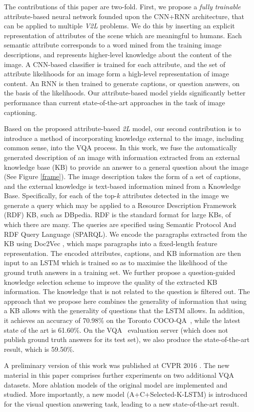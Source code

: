 The contributions of this paper are two-fold.
First, we propose a {\em fully trainable} attribute-based neural network founded upon the CNN+RNN architecture,
that can be applied to multiple \textit{V2L} problems.
We do this by inserting an explicit representation of attributes of the scene which are meaningful to humans.
Each semantic attribute corresponds to a word mined from the training image descriptions, and represents higher-level
knowledge about the content of the image. A CNN-based classifier is trained for each attribute,
and the set of attribute likelihoods for an image form a high-level representation of image content.
An RNN is then trained to generate captions, or question answers, on the basis of the likelihoods.
Our attribute-based model yields significantly better performance than current state-of-the-art approaches in the task of image captioning. %

Based on the proposed attribute-based \textit{\V2L} model,
%
%
our second contribution is to introduce 
%
a method of incorporating knowledge external to the image, including common sense, into the VQA process.
%
In this work, we fuse the automatically generated description of an image with information extracted from an external
knowledge base (KB) to provide an answer to a general question about the image (See Figure \ref{frame}). The image description takes the form of a set of captions, and the external knowledge is text-based information mined from a Knowledge Base. Specifically, for each of the top-$k$ attributes detected in the image we generate a query which may be applied to a Resource Description Framework (RDF) KB, such as DBpedia.  RDF is the standard format for large KBs, of which there are many.  The queries are specified using Semantic Protocol And RDF Query Language (SPARQL). We encode the paragraphs extracted from the KB using Doc2Vec \cite{le2014distributed}, which maps paragraphs into a fixed-length feature representation. The encoded attributes, captions, and KB information are then input to an LSTM which is trained so as to maximise the likelihood of the ground truth answers in a training set. We further propose a question-guided knowledge selection scheme to improve the quality of  the extracted KB information. The knowledge that is
not related to the question is filtered out. The approach that we propose here combines the generality of information that using a KB allows with the generality of questions that the LSTM allows.
In addition, it achieves an accuracy of 70.98\% on the Toronto COCO-QA~\cite{ren2015image}, while the latest state of the art is 61.60\%. On the VQA~\cite{antol2015vqa} evaluation server (which does not publish ground truth answers for its test set), we also produce the state-of-the-art result, which is 59.50\%.

A preliminary version of this work was published at CVPR 2016 \cite{wu2015image,wu2015ask}. The new material in this paper comprises further experiments on two additional VQA datasets. More ablation models of the original model are implemented and studied. More importantly, a new model (A+C+Selected-K-LSTM) 
%
is introduced 
%
for the visual question answering task, leading to a new state-of-the-art result.




